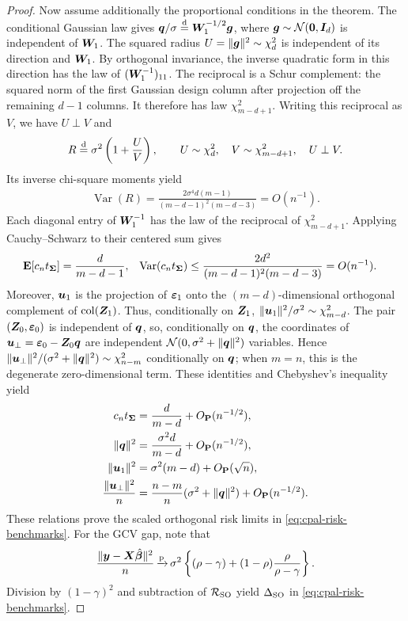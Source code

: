 \documentclass{article}
\theoremstyle{plain} %
\theoremstyle{definition} %
\theoremstyle{definition} %
\begin{document}
\begin{proof}
Now assume additionally the proportional conditions in the theorem.
The conditional Gaussian law gives
$\boldsymbol{q}/\sigma\stackrel{\rm d}{=}\boldsymbol{W}_1^{-1/2}\boldsymbol{g}$, where
$\boldsymbol{g}\sim{\mathcal N}(\mathbf{0},\boldsymbol{I}_d)$ is independent of $\boldsymbol{W}_1$.
The squared radius $U=\lVert\boldsymbol{g}\rVert^2\sim\chi^2_d$ is independent of its
direction and $\boldsymbol{W}_1$. By orthogonal invariance, the inverse quadratic
form in this direction has the law of $(\boldsymbol{W}_1^{-1})_{11}$.
The reciprocal is a Schur complement: the squared norm of the first
Gaussian design column after projection off the remaining $d-1$ columns.
It therefore has law $\chi^2_{m-d+1}$. Writing this reciprocal as $V$,
we have $U\perp V$ and
\begin{align*}
    R\stackrel{\rm d}{=}\sigma^2\left(1+\frac UV\right),
    \qquad U\sim\chi^2_d,\quad V\sim\chi^2_{m-d+1},
    \quad U\perp V.
\end{align*}
Its inverse chi-square moments yield
\begin{align*}
    \operatorname{Var}(R)
    =\frac{2\sigma^4d(m-1)}{(m-d-1)^2(m-d-3)}=O(n^{-1}).
\end{align*}
Each diagonal entry of $\boldsymbol{W}_1^{-1}$ has the law of the reciprocal of
$\chi^2_{m-d+1}$. Applying Cauchy--Schwarz to their centered sum gives
\begin{align*}
    {\mathbf{E}}[c_nt_{\boldsymbol{\Sigma}}]&=\frac{d}{m-d-1},
    &\operatorname{Var}(c_nt_{\boldsymbol{\Sigma}})
      &\leq\frac{2d^2}{(m-d-1)^2(m-d-3)}=O(n^{-1}).
\end{align*}
Moreover, $\boldsymbol{u}_1$ is the projection of ${\boldsymbol{\varepsilon} }_1$ onto the
$(m-d)$-dimensional orthogonal complement of
$\operatorname{col}(\boldsymbol{Z}_1)$. Thus, conditionally on $\boldsymbol{Z}_1$,
$\lVert\boldsymbol{u}_1\rVert^2/\sigma^2\sim\chi^2_{m-d}$.
The pair $(\boldsymbol{Z}_0,{\boldsymbol{\varepsilon} }_0)$ is independent of $\boldsymbol{q}$, so,
conditionally on $\boldsymbol{q}$, the coordinates of
$\boldsymbol{u}_\perp={\boldsymbol{\varepsilon} }_0-\boldsymbol{Z}_0\boldsymbol{q}$ are independent
${\mathcal N}(0,\sigma^2+\lVert\boldsymbol{q}\rVert^2)$ variables. Hence
$\lVert\boldsymbol{u}_\perp\rVert^2/(\sigma^2+\lVert\boldsymbol{q}\rVert^2)\sim\chi^2_{n-m}$
conditionally on $\boldsymbol{q}$; when $m=n$, this is the degenerate
zero-dimensional term.
These identities and Chebyshev's inequality yield
\begin{align*}
    c_nt_{\boldsymbol{\Sigma}}&=\frac{d}{m-d}+O_{{\mathbf{P}}}(n^{-1/2}),\\
    \lVert\boldsymbol{q}\rVert^2&=\frac{\sigma^2d}{m-d}+O_{{\mathbf{P}}}(n^{-1/2}),\\
    \lVert\boldsymbol{u}_1\rVert^2&=\sigma^2(m-d)+O_{{\mathbf{P}}}(\sqrt n),\\
    \frac{\lVert\boldsymbol{u}_\perp\rVert^2}{n}
    &=\frac{n-m}{n}(\sigma^2+\lVert\boldsymbol{q}\rVert^2)
      +O_{{\mathbf{P}}}(n^{-1/2}).
\end{align*}
These relations prove the scaled orthogonal risk limits in
\eqref{eq:cpal-risk-benchmarks}. For the GCV gap,
note that
\begin{align*}
    \frac{\lVert\boldsymbol{y}-\boldsymbol{X}\hat{\boldsymbol{\beta}}{}\rVert^2}{n}
    {\,\smash{\xrightarrow{\mathrm{p}}}}\,
    \sigma^2\left\{(\rho-\gamma)
      +(1-\rho)\frac{\rho}{\rho-\gamma}\right\}.
\end{align*}
Division by $(1-\gamma)^2$ and subtraction of ${\mathcal R}_{\rm SO}$
yield $\Delta_{\rm SO}$ in \eqref{eq:cpal-risk-benchmarks}.
\end{proof}
\end{document}
